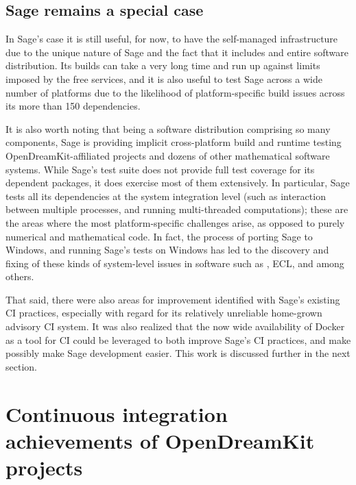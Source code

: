 \documentclass{deliverablereport}
\begin{document}

\subsection{Sage remains a special case}
In Sage's case it is still useful, for now, to have the self-managed
infrastructure due to the unique nature of Sage and the fact that it includes
and entire software distribution.  Its builds can take a very long time and run
up against limits imposed by the free services, and it is also useful to test
Sage across a wide number of platforms due to the likelihood of
platform-specific build issues across its more than 150 dependencies.

It is also worth noting that being a software distribution comprising so many
components, Sage is providing implicit cross-platform build and runtime testing
OpenDreamKit-affiliated projects and dozens of other mathematical software
systems.  While Sage's test suite does not provide full test coverage for its
dependent packages, it does exercise most of them extensively.  In particular,
Sage tests all its dependencies at the system integration level (such as
interaction between multiple processes, and running multi-threaded
computations); these are the areas where the most platform-specific challenges
arise, as opposed to purely numerical and mathematical code.  In fact, the
process of porting Sage to Windows, and running Sage's tests on Windows
 has led to the discovery and fixing of these kinds of
system-level issues in software such as \GAP, ECL, and \PariGP among
others.

That said, there were also areas for improvement identified with Sage's
existing CI practices, especially with regard for its relatively unreliable
home-grown advisory CI system.  It was also realized that the now wide
availability of Docker as a tool for CI could be leveraged to both improve
Sage's CI practices, and make possibly make Sage development easier.  This
work is discussed further in the next section.




\hypertarget{project-reports}{%
\section{Continuous integration achievements of OpenDreamKit projects}\label{project-reports}}
\end{document}
